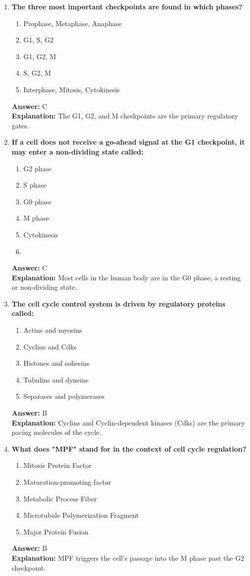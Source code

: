 \documentclass[11pt, a4paper]{article}
\begin{document}
\begin{enumerate}[leftmargin=*, label=\arabic*.]
\item \textbf{The three most important checkpoints are found in which phases?}
\begin{enumerate}[label=\Alph*.]
\item Prophase, Metaphase, Anaphase
\item G1, S, G2
\item G1, G2, M
\item S, G2, M
\item Interphase, Mitosis, Cytokinesis
\end{enumerate}
\textbf{Answer:} C \\
\textbf{Explanation:} The G1, G2, and M checkpoints are the primary regulatory gates.

\item \textbf{If a cell does not receive a go-ahead signal at the G1 checkpoint, it may enter a non-dividing state called:}
\begin{enumerate}[label=\Alph*.]
\item G2 phase
\item S phase
\item G0 phase
\item M phase
\item Cytokinesis
\item 
\end{enumerate}
\textbf{Answer:} C \\
\textbf{Explanation:} Most cells in the human body are in the G0 phase, a resting or non-dividing state.

\item \textbf{The cell cycle control system is driven by regulatory proteins called:}
\begin{enumerate}[label=\Alph*.]
\item Actins and myosins
\item Cyclins and Cdks
\item Histones and cohesins
\item Tubulins and dyneins
\item Separases and polymerases
\end{enumerate}
\textbf{Answer:} B \\
\textbf{Explanation:} Cyclins and Cyclin-dependent kinases (Cdks) are the primary pacing molecules of the cycle.

\item \textbf{What does "MPF" stand for in the context of cell cycle regulation?}
\begin{enumerate}[label=\Alph*.]
\item Mitosis Protein Factor
\item Maturation-promoting factor
\item Metabolic Process Fiber
\item Microtubule Polymerization Fragment
\item Major Protein Fusion
\end{enumerate}
\textbf{Answer:} B \\
\textbf{Explanation:} MPF triggers the cell's passage into the M phase past the G2 checkpoint.


\end{enumerate}
\end{document}
